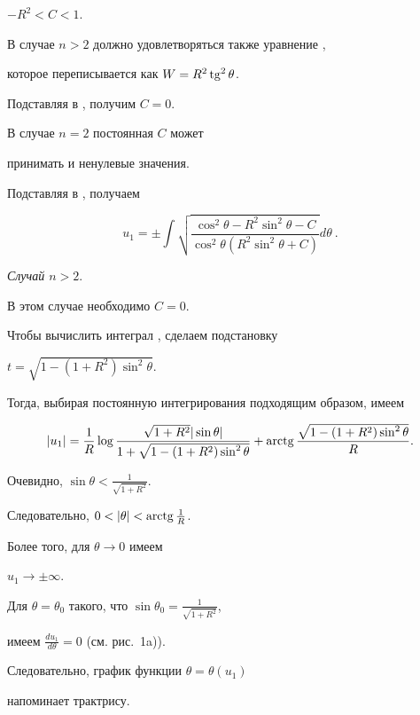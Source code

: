 $- R^2 < C < 1$.


В случае $n>2$ должно удовлетворяться также уравнение ,


которое переписывается как $W = R^2 \operatorname{tg}^2\theta$.


Подставляя  в , получим $C=0$.


В случае $n=2$ постоянная $C$ может


принимать и ненулевые значения.


Подставляя  в , получаем


\begin{equation} \label{quadr}


u_1 = \pm \int \sqrt{\frac{\cos^2\theta-R^2\sin^2\theta-C}{\cos^2\theta


(R^2\sin^2\theta+C)}} d\theta \ .


\end{equation}








{\it Случай $n>2$}.


В этом случае необходимо $C=0$.


Чтобы вычислить интеграл , сделаем подстановку


$t = \sqrt{1-(1+R^2)\sin^2\theta}$.


Тогда, выбирая постоянную интегрирования подходящим образом, имеем


$$


|u_1| = \frac{1}{R} 


\log \frac{\sqrt{1+R^2}|\sin\theta|}{1+\sqrt{1-(1+R^2)\sin^2\theta}}


+\arctg \frac{\sqrt{1-(1+R^2)\sin^2\theta}}{R}.


$$


Очевидно, $\sin\theta < \frac{1}{\sqrt{1+R^2}}$.


Следовательно, $0 < |\theta| < \operatorname{arctg} \frac{1}{R}$.


Более того, для $\theta \rightarrow 0$ имеем


$u_1 \rightarrow \pm \infty$.


Для $\theta=\theta_0$ такого, что $\sin\theta_0=\frac{1}{\sqrt{1+R^2}}$,


имеем $\frac{d u_1}{d \theta} = 0$ (см. рис.~1a)).


Следовательно, график функции $\theta=\theta(u_1)$


напоминает трактрису.


